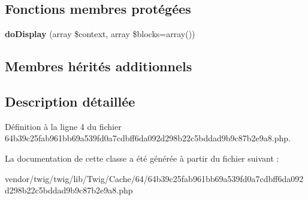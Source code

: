\subsection*{Fonctions membres protégées}
\begin{DoxyCompactItemize}
\item 
{\bfseries do\+Display} (array \$context, array \$blocks=array())\hypertarget{class_____twig_template__296178103fd4401f4554dcbbca99227cde6687a09ad34f582f8397ba8b0f7040_adb62b7c226e07d30f836ed16158d924f}{}\label{class_____twig_template__296178103fd4401f4554dcbbca99227cde6687a09ad34f582f8397ba8b0f7040_adb62b7c226e07d30f836ed16158d924f}

\end{DoxyCompactItemize}
\subsection*{Membres hérités additionnels}


\subsection{Description détaillée}


Définition à la ligne 4 du fichier 64b39c25fab961bb69a539fd0a7cdbff6da092d298b22c5bddad9b9c87b2e9a8.\+php.



La documentation de cette classe a été générée à partir du fichier suivant \+:\begin{DoxyCompactItemize}
\item 
vendor/twig/twig/lib/\+Twig/\+Cache/64/64b39c25fab961bb69a539fd0a7cdbff6da092d298b22c5bddad9b9c87b2e9a8.\+php\end{DoxyCompactItemize}
